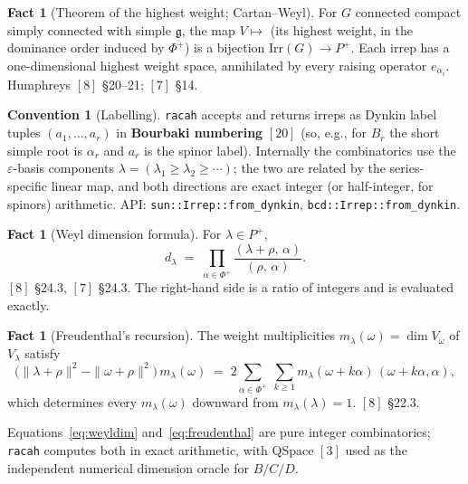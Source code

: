 \documentclass[11pt,a4paper]{article}
\theoremstyle{plain}
\theoremstyle{definition}
\newtheorem{fact}[theorem]{Fact}
\newtheorem{convention}[theorem]{Convention}
\newcommand{\g}{\mathfrak{g}}
\newcommand{\Irr}{\mathrm{Irr}}
\newcommand{\code}[1]{\texttt{#1}}
\begin{document}
\begin{fact}[Theorem of the highest weight; Cartan--Weyl]\label{fact:hw}
For $G$ connected compact simply connected with simple $\g$, the map
$V\mapsto$ (its highest weight, in the dominance order induced by $\Phi^+$)
is a bijection $\Irr(G)\to P^+$. Each irrep has a one-dimensional highest
weight space, annihilated by every raising operator $e_{\alpha_i}$.
Humphreys $[8]$ \S20--21; $[7]$ \S14.
\end{fact}

\begin{convention}[Labelling]\label{conv:labelling}
\code{racah} accepts and returns irreps as Dynkin label tuples
$(a_1,\dots,a_r)$ in \textbf{Bourbaki numbering} $[20]$ (so, e.g., for $B_r$
the short simple root is $\alpha_r$ and $a_r$ is the spinor label). Internally
the combinatorics use the $\varepsilon$-basis components
$\lambda=(\lambda_1\ge\lambda_2\ge\cdots)$; the two are related by the
series-specific linear map, and both directions are exact integer (or
half-integer, for spinors) arithmetic. API: \code{sun::Irrep::from\_dynkin},
\code{bcd::Irrep::from\_dynkin}.
\end{convention}

\begin{fact}[Weyl dimension formula]\label{fact:weyldim}
For $\lambda\in P^+$,
\begin{equation}\label{eq:weyldim}
  d_\lambda \;=\; \prod_{\alpha\in\Phi^+}
    \frac{(\lambda+\rho,\,\alpha)}{(\rho,\,\alpha)} .
\end{equation}
$[8]$ \S24.3, $[7]$ \S24.3. The right-hand side is a ratio of integers and is
evaluated exactly.
\end{fact}

\begin{fact}[Freudenthal's recursion]\label{fact:freudenthal}
The weight multiplicities $m_\lambda(\omega)=\dim V_\omega$ of $V_\lambda$
satisfy
\begin{equation}\label{eq:freudenthal}
  \bigl( \|\lambda+\rho\|^2 - \|\omega+\rho\|^2 \bigr)\, m_\lambda(\omega)
  \;=\; 2 \sum_{\alpha\in\Phi^+}\ \sum_{k\ge 1}
        m_\lambda(\omega+k\alpha)\,(\omega+k\alpha,\alpha),
\end{equation}
which determines every $m_\lambda(\omega)$ downward from
$m_\lambda(\lambda)=1$. $[8]$ \S22.3.
\end{fact}

Equations~\eqref{eq:weyldim} and~\eqref{eq:freudenthal} are pure integer
combinatorics; \code{racah} computes both in exact arithmetic, with QSpace
$[3]$ used as the independent numerical dimension oracle for $B/C/D$.
\end{document}
